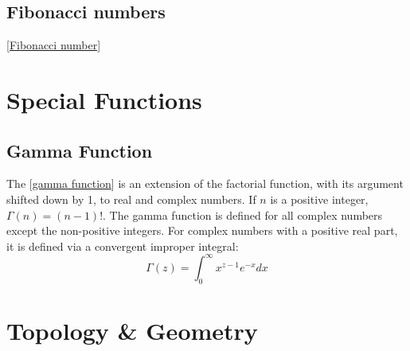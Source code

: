\subsection{Fibonacci numbers}

[\href{https://en.wikipedia.org/wiki/Fibonacci_number}{Fibonacci number}]

%
%
%
%  
%  
%  

\section{Special Functions}

\subsection{Gamma Function}

The [\href{https://en.wikipedia.org/wiki/Gamma_function}{gamma function}]
is an extension of the factorial function, with its argument shifted down
by 1, to real and complex numbers. If $n$ is a positive integer,
$\Gamma(n) = (n-1)!$. The gamma function is defined for all complex numbers
except the non-positive integers. For complex numbers with a positive real
part, it is defined via a convergent improper integral:
$$\Gamma(z) = \int_0^\infty x^{z-1} e^{-x} dx $$

\section{Topology \& Geometry}

